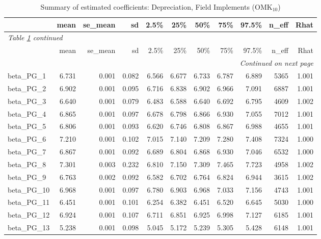 \documentclass[12pt]{article}
\begin{document}
\begingroup
\footnotesize
\setlength{\tabcolsep}{3pt}
\begin{longtable}{lrrrrrrrrrr}
\caption{Summary of estimated coefficients: Depreciation, Field Implements (OMK$_\text{10}$)}
\label{tab:coef_summary_omk10} \\
\toprule
 & mean & se\_mean & sd & 2.5\% & 25\% & 50\% & 75\% & 97.5\% & n\_eff & Rhat \\
\midrule
\endfirsthead
\multicolumn{11}{l}{\textit{Table \ref{tab:coef_summary_omk10} continued}} \\
\toprule
 & mean & se\_mean & sd & 2.5\% & 25\% & 50\% & 75\% & 97.5\% & n\_eff & Rhat \\
\midrule
\endhead
\midrule
\multicolumn{11}{r}{\textit{Continued on next page}} \\
\endfoot
\bottomrule
\endlastfoot
beta\_PG\_1  &  6.731 & 0.001 & 0.082 &  6.566 &  6.677 &  6.733 &  6.787 &  6.889 &  5365 & 1.001 \\
beta\_PG\_2  &  6.902 & 0.001 & 0.095 &  6.716 &  6.838 &  6.902 &  6.966 &  7.091 &  6887 & 1.001 \\
beta\_PG\_3  &  6.640 & 0.001 & 0.079 &  6.483 &  6.588 &  6.640 &  6.692 &  6.795 &  4609 & 1.002 \\
beta\_PG\_4  &  6.865 & 0.001 & 0.097 &  6.678 &  6.798 &  6.866 &  6.930 &  7.055 &  7012 & 1.001 \\
beta\_PG\_5  &  6.806 & 0.001 & 0.093 &  6.620 &  6.746 &  6.808 &  6.867 &  6.988 &  4655 & 1.001 \\
beta\_PG\_6  &  7.210 & 0.001 & 0.102 &  7.015 &  7.140 &  7.209 &  7.280 &  7.408 &  7324 & 1.000 \\
beta\_PG\_7  &  6.867 & 0.001 & 0.092 &  6.689 &  6.804 &  6.868 &  6.930 &  7.046 &  6532 & 1.000 \\
beta\_PG\_8  &  7.301 & 0.003 & 0.232 &  6.810 &  7.150 &  7.309 &  7.465 &  7.723 &  4958 & 1.002 \\
beta\_PG\_9  &  6.763 & 0.002 & 0.092 &  6.582 &  6.702 &  6.764 &  6.824 &  6.944 &  3615 & 1.002 \\
beta\_PG\_10 &  6.968 & 0.001 & 0.097 &  6.780 &  6.903 &  6.968 &  7.033 &  7.156 &  4743 & 1.001 \\
beta\_PG\_11 &  6.451 & 0.001 & 0.101 &  6.254 &  6.382 &  6.451 &  6.520 &  6.645 &  5030 & 1.000 \\
beta\_PG\_12 &  6.924 & 0.001 & 0.107 &  6.711 &  6.851 &  6.925 &  6.998 &  7.127 &  6185 & 1.001 \\
beta\_PG\_13 &  5.238 & 0.001 & 0.098 &  5.045 &  5.172 &  5.239 &  5.305 &  5.428 &  6148 & 1.001 \\

\end{longtable}
\end{document}
